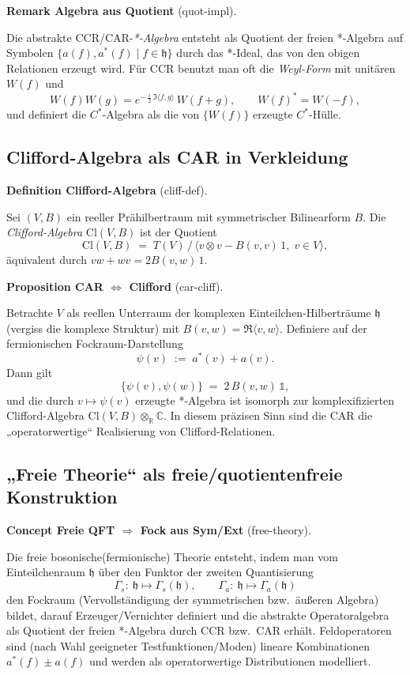 \documentclass[10pt, letterpaper]{article}
\newcommand{\Cl}{\mathrm{Cl}}
\newcommand{\CustomHeading}[3]{%
  \par\medskip\noindent%
  \textbf{#1 #2} \textnormal{(#3)}.\enskip%
}
\newenvironment{DEF}[2]{\begin{unitbox}\CustomHeading{Definition}{#1}{#2}}{\end{unitbox}}
\newenvironment{PROP}[2]{\begin{unitbox}\CustomHeading{Proposition}{#1}{#2}}{\end{unitbox}}
\newenvironment{REM}[2]{\begin{unitbox}\CustomHeading{Remark}{#1}{#2}}{\end{unitbox}}
\newenvironment{CONC}[2]{\begin{unitbox}\CustomHeading{Concept}{#1}{#2}}{\end{unitbox}}
\begin{document}
\begin{REM}{Algebra aus Quotient}{quot-impl}
Die abstrakte CCR/CAR-\emph{*-Algebra} entsteht als Quotient der freien *-Algebra auf Symbolen
$\{a(f),a^*(f)\mid f\in\mathfrak{h}\}$ durch das *-Ideal, das von den obigen Relationen erzeugt wird.
Für CCR benutzt man oft die \emph{Weyl-Form} mit unitären $W(f)$ und
\[
W(f)W(g)=e^{-\,\tfrac{i}{2}\,\Im\langle f,g\rangle}\,W(f+g),\qquad W(f)^*=W(-f),
\]
und definiert die $C^*$-Algebra als die von $\{W(f)\}$ erzeugte $C^*$-Hülle.
\end{REM}

\subsection{Clifford-Algebra als CAR in Verkleidung}

\begin{DEF}{Clifford-Algebra}{cliff-def}
Sei $(V,B)$ ein reeller Prähilbertraum mit symmetrischer Bilinearform $B$.
Die \emph{Clifford-Algebra} $\Cl(V,B)$ ist der Quotient
\[
\Cl(V,B) \;=\; T(V)\,\big/\,\langle v\otimes v - B(v,v)\,1,\; v\in V\rangle,
\]
äquivalent durch $vw+wv=2B(v,w)\,1$.
\end{DEF}

\begin{PROP}{CAR $\Leftrightarrow$ Clifford}{car-cliff}
Betrachte $V$ als reellen Unterraum der komplexen Einteilchen-Hilberträume $\mathfrak{h}$ (vergiss die komplexe Struktur)
mit $B(v,w)=\Re\langle v,w\rangle$. Definiere auf der fermionischen Fockraum-Darstellung
\[
\psi(v)\;:=\; a^*(v)+a(v).
\]
Dann gilt
\[
\{\psi(v),\psi(w)\}\;=\;2\,B(v,w)\,\mathbb{1},
\]
und die durch $v\mapsto \psi(v)$ erzeugte *-Algebra ist isomorph zur komplexifizierten Clifford-Algebra
$\Cl(V,B)\otimes_\mathbb{R}\mathbb{C}$. In diesem präzisen Sinn sind die CAR die „operatorwertige“ Realisierung von
Clifford-Relationen.
\end{PROP}

\subsection{„Freie Theorie“ als freie/quotientenfreie Konstruktion}

\begin{CONC}{Freie QFT $\Rightarrow$ Fock aus Sym/Ext}{free-theory}
Die freie bosonische(fermionische) Theorie entsteht, indem man vom Einteilchenraum $\mathfrak{h}$
über den Funktor der zweiten Quantisierung
\[
\Gamma_s:\ \mathfrak{h}\mapsto \Gamma_s(\mathfrak{h}),\qquad
\Gamma_a:\ \mathfrak{h}\mapsto \Gamma_a(\mathfrak{h})
\]
den Fockraum (Vervollständigung der symmetrischen bzw.\ äußeren Algebra) bildet, darauf
Erzeuger/Vernichter definiert und die abstrakte Operatoralgebra als Quotient der freien *-Algebra
durch CCR bzw.\ CAR erhält. Feldoperatoren sind (nach Wahl geeigneter Testfunktionen/Moden) lineare
Kombinationen $a^*(f)\pm a(f)$ und werden als operatorwertige Distributionen modelliert.
\end{CONC}
\end{document}
